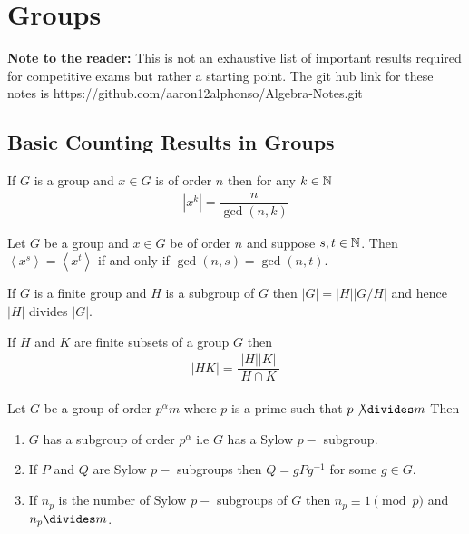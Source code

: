 \chapter{Groups}

\textbf{Note to the reader:} This is not an exhaustive list of important results required for competitive exams but rather a starting point. The git hub link  for these notes is https://github.com/aaron12alphonso/Algebra-Notes.git                   
\section{Basic Counting Results in Groups}

\begin{theorem}
	If $G$ is a group and $x\in G$ is of order $n$ then for any $k\in \mathbb{N}$
	\begin{align*}
		|x^k|=\dfrac{n}{\gcd(n,k)}
	\end{align*} 	
\end{theorem}

\begin{theorem}
	Let $G$ be a group and $x\in G$ be of order $n$ and suppose $s,t\in \mathbb{N}$. Then $\left\langle x^s\right\rangle=\left\langle x^t\right\rangle$ if and only if $\gcd(n,s)=\gcd(n,t)$.
\end{theorem}

\begin{theorem}
	If $G$ is a finite group and $H$ is a subgroup of $G$ then $|G|=|H||G/H|$ and hence $|H|$ divides $|G|$.
\end{theorem}

\begin{theorem}
	If $H$ and $K$ are finite subsets of a group $G$ then 
	\begin{align}
		|HK|=\dfrac{|H||K|}{|H\cap K|}
	\end{align}
\end{theorem}

\begin{theorem}
	Let $G$ be a group of order $p^\alpha m$ where $p$ is a prime such that $p\not\divides m$ Then 
	\begin{enumerate}
		\item 
		$G$ has a subgroup of order $p^\alpha$ i.e $G$ has a Sylow $p-$ subgroup.
		\item 
		If $P$ and $Q$ are Sylow $p-$ subgroups then $Q=gPg^{-1}$ for some $g\in G$.
		\item 
		If $n_p$ is the number of Sylow $p-$ subgroups of $G$ then $n_p\equiv 1\pmod p$ and $n_p\divides m$.
	\end{enumerate}
\end{theorem}

